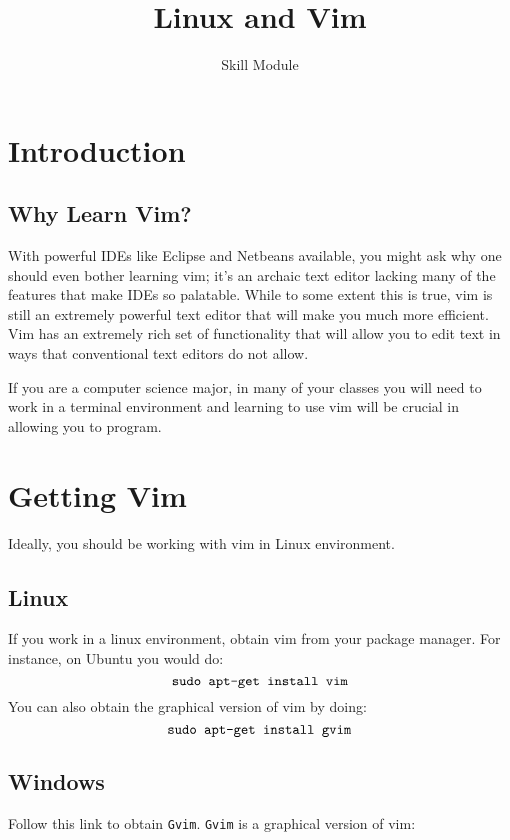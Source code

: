 

\title{Linux and Vim}
\author{Skill Module}
\date{}


\maketitle

\section{Introduction}

\subsection{Why Learn Vim?}
With powerful IDEs like Eclipse and Netbeans available, you might ask why
one should even bother learning vim; it's an archaic text editor lacking
many of the features that make IDEs so palatable. While to some extent
this is true, vim is still an extremely powerful text editor that will
make you much more efficient. Vim has an extremely rich set of
functionality that will allow you to edit text in ways that conventional
text editors do not allow.

If you are a computer science major, in many of your classes you will
need to work in a terminal environment and learning to use vim will be
crucial in allowing you to program.

\section{Getting Vim}
Ideally, you should be working with vim in Linux environment. 

\subsection{Linux}
If you work in a linux environment, obtain vim from your package manager.
For instance, on Ubuntu you would do:
$$\text{\texttt{sudo apt-get install vim}}$$
You can also obtain the graphical version of vim by doing:
$$\text{\texttt{sudo apt-get install gvim}}$$

\subsection{Windows}
Follow this link to obtain \texttt{Gvim}. \texttt{Gvim} is a graphical
version of vim: %

